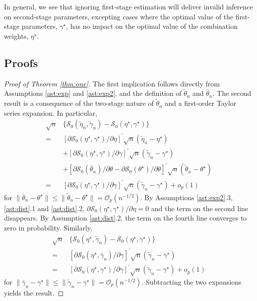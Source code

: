 \documentclass[12pt]{article}
\theoremstyle{definition}
\theoremstyle{remark}
\begin{document}
In general, we see that ignoring first-stage estimation will deliver invalid inference on second-stage parameters, excepting cases where the optimal value of the first-stage parameters, $\gamma^{\star}$, has no impact on the optimal value of the combination weights, $\eta^{\star}$.

\subsection{Proofs\label{subsec:proofs}}

\begin{proof}[Proof of Theorem \ref{thm:one}]
The first implication follows directly from Assumptions \ref{ast:exp} and \ref{ast:exp2}, and the definition of $\tilde\theta_{n}$ and $\hat{\theta}_{n}$. The second result is a consequence of the two-stage nature of $\tilde\theta_{n}$ and a first-order Taylor series expansion. In particular,
\begin{align*}
\sqrt{n} & \{ \mathcal{S}_0(\tilde{\eta}_{n},\tilde{\gamma}_{n}) - \mathcal{S}_0(\eta^{\star},\gamma^{\star}) \} \\
= & \left[{\partial \mathcal{S}_0(\eta^{\star}, \gamma^{\star})}/{\partial \eta}\right]^{\prime} \sqrt{n}(\tilde{\eta}_{n} - \eta^{\star}) \\
& + \left[{\partial \mathcal{S}_0(\eta^{\star}, \gamma^{\star})}/{\partial \gamma}\right]^{\prime} \sqrt{n} (\tilde{\gamma}_{n} - \gamma^{\star}) \\
& + \left[{\partial \mathcal{S}_0(\bar{\theta}_{n})}/{\partial \theta} - {\partial \mathcal{S}_0(\theta^{\star})}/{\partial \theta} \right]^{\prime} \sqrt{n}(\tilde{\theta}_{n} - \theta^{\star}) \\
= & [{\partial \mathcal{S}_0(\eta^\star, \gamma^\star)}/{\partial \gamma}]^{\prime} \sqrt{n}(\tilde{\gamma}_{n} - \gamma^{\star}) + o_p(1)
\end{align*}
for $\| \bar\theta_{n} - \theta^{\star} \| \leq \| \tilde{\theta}_{n} - \theta^{\star} \| = \mathcal{O}_p(n^{-1/2})$. By Assumptions \ref{ast:exp2}.3, \ref{ast:dist}.1 and \ref{ast:dist}.2, $\partial \mathcal{S}_0(\eta^{\star}, \gamma^{\star})/\partial \eta = 0$ and the term on the second line disappears. By Assumption \ref{ast:dist}.2, the term on the fourth line converges to zero in probability. Similarly,
\begin{align*}
\sqrt{n} & \{ \mathcal{S}_0(\eta^{\star}, \tilde{\gamma}_{n}) - \mathcal{S}_0(\eta^{\star}, \gamma^{\star}) \} \\
= & \left[{ \partial \mathcal{S}_0(\eta^{\star}, \bar{\gamma}_{n})}/{\partial \gamma} \right]^{\prime} \sqrt{n}(\tilde{\gamma}_{n} - \gamma^{\star}) \\
= & \left[{ \partial \mathcal{S}_0(\eta^{\star}, \gamma^{\star})}/{\partial \gamma}\right]^{\prime}\sqrt{n}(\tilde{\gamma}_{n}-\gamma^{\star}) + o_p(1)
\end{align*}
for $\lVert \bar{\gamma}_n - \gamma^{\star} \rVert \leq \lVert \tilde{\gamma}_n - \gamma^{\star} \rVert = \mathcal{O}_p(n^{-1/2})$. Subtracting the two expansions yields the result.
\end{proof}
\end{document}
